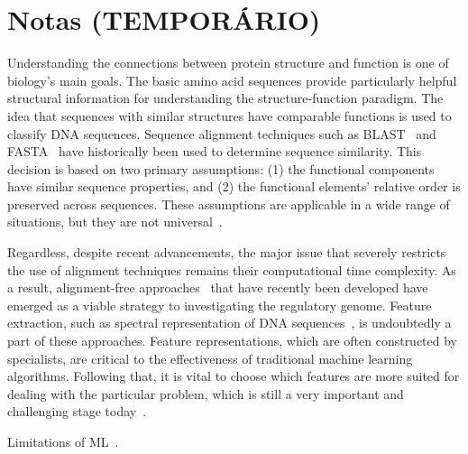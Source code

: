 \section{Notas (TEMPORÁRIO)}

Understanding the connections between protein structure and function is one of biology's main goals. The basic amino acid sequences provide particularly helpful structural information for understanding the structure-function paradigm. The idea that sequences with similar structures have comparable functions is used to classify DNA sequences. Sequence alignment techniques such as BLAST~\cite{Altschul1990BasicTool} and FASTA~\cite{Pearson1988ImprovedComparison} have historically been used to determine sequence similarity. This decision is based on two primary assumptions: (1) the functional components have similar sequence properties, and (2) the functional elements' relative order is preserved across sequences. These assumptions are applicable in a wide range of situations, but they are not universal~\cite{LoBosco2017DeepClassification}.

Regardless, despite recent advancements, the major issue that severely restricts the use of alignment techniques remains their computational time complexity. As a result, alignment-free approaches~\cite{Vinga2003Alignment-freeReview,Pinello2014ApplicationsEpigenomics} that have recently been developed have emerged as a viable strategy to investigating the regulatory genome. Feature extraction, such as spectral representation of DNA sequences~\cite{LoBosco2014ASequences,LoBosco2015AlignmentClassification}, is undoubtedly a part of these approaches. Feature representations, which are often constructed by specialists, are critical to the effectiveness of traditional machine learning algorithms. Following that, it is vital to choose which features are more suited for dealing with the particular problem, which is still a very important and challenging stage today~\cite{LoBosco2017DeepClassification}.

Limitations of \gls{ML}~\cite{Abd-Alhalem2021DNASurvey}.

